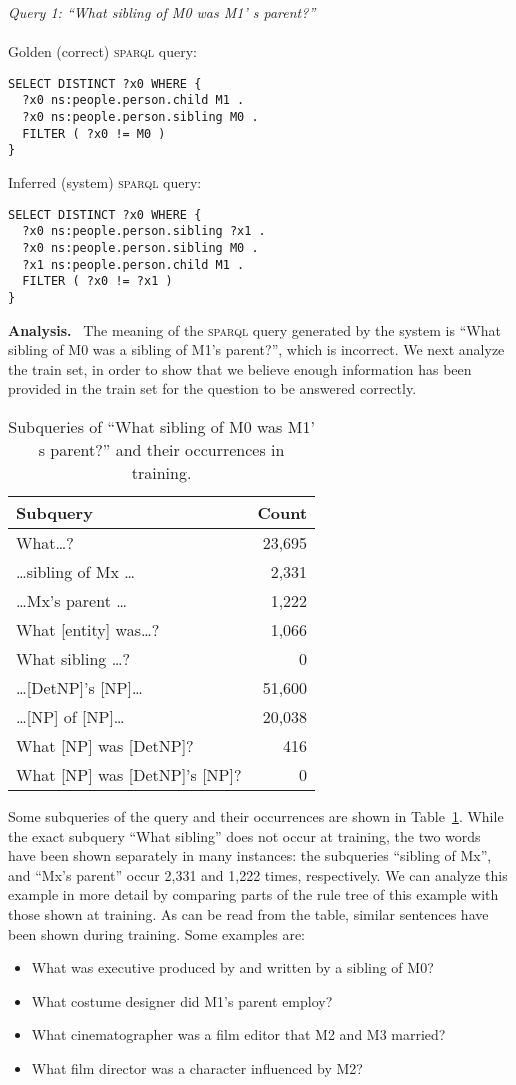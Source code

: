 \documentclass[letterpaper]{article}
\newcommand{\myparagraph}[1]{\textbf{#1}~}
\newcommand{\SPARQL}{\textsc{sparql}}
\begin{document}
\textit{Query 1: ``What sibling of M0 was M1' s parent?''}\\\\
Golden (correct) \SPARQL{} query:
\begin{verbatim}
SELECT DISTINCT ?x0 WHERE { 
  ?x0 ns:people.person.child M1 . 
  ?x0 ns:people.person.sibling M0 . 
  FILTER ( ?x0 != M0 ) 
}
\end{verbatim}
Inferred (system) \SPARQL{} query:
\begin{verbatim}
SELECT DISTINCT ?x0 WHERE { 
  ?x0 ns:people.person.sibling ?x1 . 
  ?x0 ns:people.person.sibling M0 . 
  ?x1 ns:people.person.child M1 . 
  FILTER ( ?x0 != ?x1 ) 
}
\end{verbatim}
\myparagraph{Analysis.}
The meaning of the \SPARQL{} query generated by the system is ``What sibling of M0 was a sibling of M1's parent?'', which is incorrect. We next analyze the train set, in order to show that we believe enough information has been provided in the train set for the question to be answered correctly. 

\begin{table}[tb]
  \centering
  \begin{tabular}{@{}lr@{}}
  \hline
Subquery & Count\\
\hline
\hline
What\ldots? & 23,695\\
\ldots sibling of Mx \ldots& 2,331\\
\ldots Mx's parent \ldots& 1,222\\
What [entity] was\ldots? & 1,066\\
What sibling \ldots?& 0\\
\hline
\ldots [DetNP]'s [NP]\ldots & 51,600\\
\ldots [NP] of [NP]\ldots & 20,038\\
What [NP] was [DetNP]? & 416\\
What [NP] was [DetNP]'s [NP]? & 0\\
\hline
  \end{tabular}
  \caption{Subqueries of ``What sibling of M0 was M1' s parent?'' and their occurrences in training.}
  \label{table:qual-analysis:q1}
\end{table}

Some subqueries of the query and their occurrences are shown in Table~\ref{table:qual-analysis:q1}.
While the exact subquery ``What sibling'' does not occur at training, the two words have been shown separately in many instances: the subqueries ``sibling of Mx'', and ``Mx's parent'' occur 2,331 and 1,222 times, respectively. We can analyze this example in more detail by comparing parts of the rule tree of this example with those shown at training. As can be read from the table, similar sentences have been shown during training. Some examples are:
\begin{itemize}
    \item What was executive produced by and written by a sibling of M0?
    \item What costume designer did M1's parent employ?
    \item What cinematographer was a film editor that M2 and M3 married?
    \item What film director was a character influenced by M2?
\end{itemize}
\end{document}
